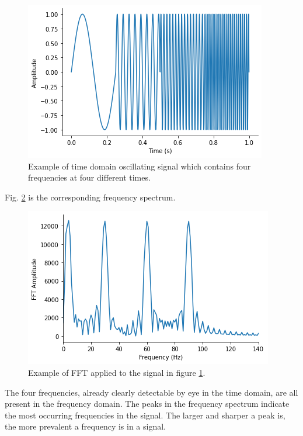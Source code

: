 \documentclass[12pt,a4paper]{report}
\begin{document}
\begin{figure}[!ht]
\centering
\includegraphics[scale=0.80]{examplesignalchangesfrequency.png}
\caption{Example of time domain oscillating signal which contains four frequencies at four different times.}
\label{exampletimedomainsignal}
\end{figure}

Fig. \ref{exampleFFTtimedomainsignal} is the corresponding frequency spectrum.

\begin{figure}[!ht]
\centering
\includegraphics[scale=0.80]{exampleFFTsignalchangesfrequency.png}
\caption{Example of FFT applied to the signal in figure \ref{exampletimedomainsignal}.}
\label{exampleFFTtimedomainsignal}
\end{figure}

The four frequencies, already clearly detectable by eye in the time domain, are all present in the frequency domain. The peaks in the frequency spectrum indicate the most occurring frequencies in the signal. The larger and sharper a peak is, the more prevalent a frequency is in a signal. 
\end{document}
